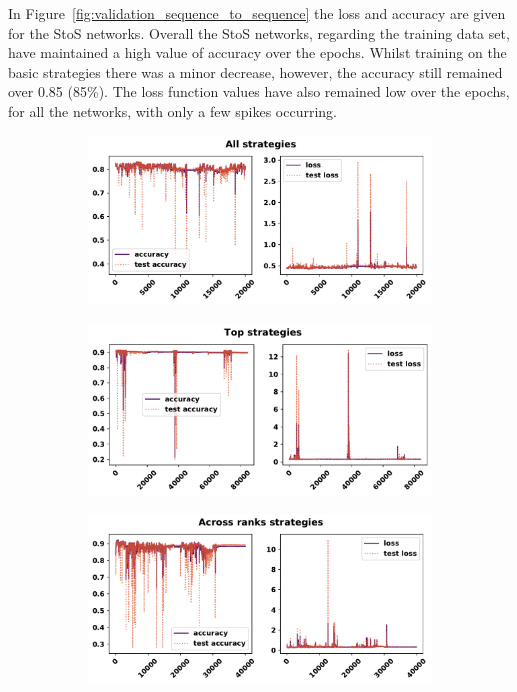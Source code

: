 In Figure~\ref{fig:validation_sequence_to_sequence} the loss and accuracy are
given for the StoS networks. Overall the StoS networks, regarding the training
data set, have maintained a high value of accuracy over the epochs. Whilst
training on the basic strategies there was a minor decrease, however, the
accuracy still remained over 0.85 (85\%). The loss function values have also
remained low over the epochs, for all the networks, with only a few spikes
occurring.

\begin{figure}[!htbp]
    \begin{subfigure}{\textwidth}
    \centering
    \includegraphics[width=.8\textwidth]{src/chapters/07/img/validation_plot_all_strategies.pdf}
    \end{subfigure}\hfill
    \begin{subfigure}{\textwidth}
    \centering
    \includegraphics[width=.8\textwidth]{src/chapters/07/img/validation_plot_top_strategies.pdf}
    \end{subfigure}
    \begin{subfigure}{\textwidth}
    \centering
    \includegraphics[width=.8\textwidth]{src/chapters/07/img/validation_plot_across_ranks_strategies.pdf}

\end{subfigure}
\end{figure}
